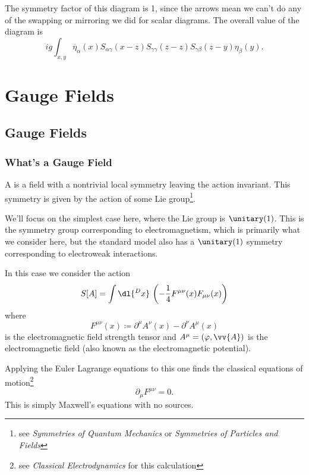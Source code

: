 \documentclass[fleqn]{NotesClass}
\newcommand*{\course}[1]{\textit{#1}}
\newcommand{\diracadjoint}[1]{\overbar{#1}}
\begin{document}
    The symmetry factor of this diagram is 1, since the arrows mean we can't do any of the swapping or mirroring we did for scalar diagrams.
    The overall value of the diagram is
    \begin{equation}
        ig \int_{x, y} \diracadjoint{\eta}_\alpha(x) S_{\alpha\gamma}(x - z) S_{\gamma\gamma}(z - z) S_{\gamma\beta}(z - y) \eta_\beta(y).
    \end{equation}
    
    \part{Gauge Fields}
    \chapter{Gauge Fields}
    \section{What's a Gauge Field}
    A  is a field with a nontrivial local symmetry leaving the action invariant.
    This symmetry is given by the action of some Lie group\footnote{see \course{Symmetries of Quantum Mechanics} or \course{Symmetries of Particles and Fields}}.
    
    We'll focus on the simplest case here, where the Lie group is \(\unitary(1)\).
    This is the symmetry group corresponding to electromagnetism, which is primarily what we consider here, but the standard model also has a \(\unitary(1)\) symmetry corresponding to electroweak interactions.
    
    In this case we consider the action
    \begin{equation}
        S[A] = \int \dl{^Dx} \, \left( -\frac{1}{4} F^{\mu\nu}(x)F_{\mu\nu}(x) \right)
    \end{equation}
    where
    \begin{equation}
        F^{\mu\nu}(x) \coloneqq \partial^\mu A^\nu(x) - \partial^\nu A^\mu(x)
    \end{equation}    
    is the electromagnetic field strength tensor and \(A^\mu = (\varphi, \vv{A})\) is the electromagnetic field (also known as the electromagnetic potential).
    
    Applying the Euler Lagrange equations to this one finds the classical equations of motion\footnote{see \course{Classical Electrodynamics} for this calculation}
    \begin{equation}
        \partial_\mu F^{\mu\nu} = 0.
    \end{equation}
    This is simply Maxwell's equations with no sources.
    
\end{document}
